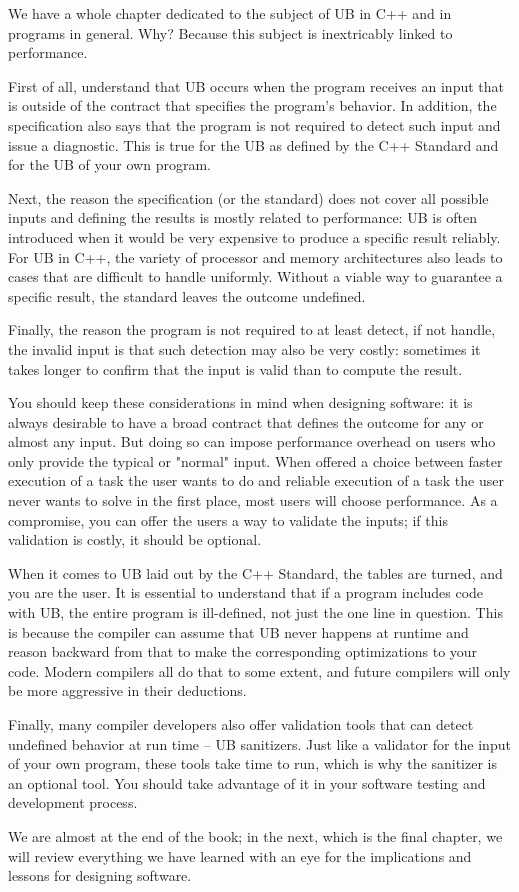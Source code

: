 We have a whole chapter dedicated to the subject of UB in C++ and in programs in general. Why? Because this subject is inextricably linked to performance.

First of all, understand that UB occurs when the program receives an input that is outside of the contract that specifies the program's behavior. In addition, the specification also says that the program is not required to detect such input and issue a diagnostic. This is true for the UB as defined by the C++ Standard and for the UB of your own program.

Next, the reason the specification (or the standard) does not cover all possible inputs and defining the results is mostly related to performance: UB is often introduced when it would be very expensive to produce a specific result reliably. For UB in C++, the variety of processor and memory architectures also leads to cases that are difficult to handle uniformly. Without a viable way to guarantee a specific result, the standard leaves the outcome undefined.

Finally, the reason the program is not required to at least detect, if not handle, the invalid input is that such detection may also be very costly: sometimes it takes longer to confirm that the input is valid than to compute the result.

You should keep these considerations in mind when designing software: it is always desirable to have a broad contract that defines the outcome for any or almost any input. But doing so can impose performance overhead on users who only provide the typical or "normal" input. When offered a choice between faster execution of a task the user wants to do and reliable execution of a task the user never wants to solve in the first place, most users will choose performance. As a compromise, you can offer the users a way to validate the inputs; if this validation is costly, it should be optional.

When it comes to UB laid out by the C++ Standard, the tables are turned, and you are the user. It is essential to understand that if a program includes code with UB, the entire program is ill-defined, not just the one line in question. This is because the compiler can assume that UB never happens at runtime and reason backward from that to make the corresponding optimizations to your code. Modern compilers all do that to some extent, and future compilers will only be more aggressive in their deductions. 

Finally, many compiler developers also offer validation tools that can detect undefined behavior at run time – UB sanitizers. Just like a validator for the input of your own program, these tools take time to run, which is why the sanitizer is an optional tool. You should take advantage of it in your software testing and development process. 

We are almost at the end of the book; in the next, which is the final chapter, we will review everything we have learned with an eye for the implications and lessons for designing software.